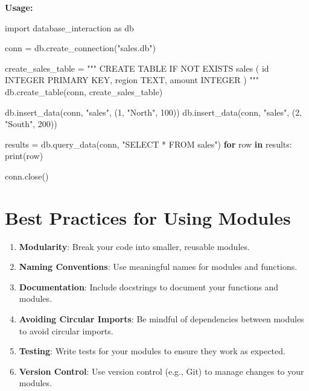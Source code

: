 \documentclass[
  letterpaper,
  DIV=11,
  numbers=noendperiod]{scrreprt}
\newenvironment{Shaded}{\begin{snugshade}}{\end{snugshade}}
\newcommand{\BuiltInTok}[1]{\textcolor[rgb]{0.00,0.23,0.31}{#1}}
\newcommand{\ControlFlowTok}[1]{\textcolor[rgb]{0.00,0.23,0.31}{\textbf{#1}}}
\newcommand{\DecValTok}[1]{\textcolor[rgb]{0.68,0.00,0.00}{#1}}
\newcommand{\ImportTok}[1]{\textcolor[rgb]{0.00,0.46,0.62}{#1}}
\newcommand{\KeywordTok}[1]{\textcolor[rgb]{0.00,0.23,0.31}{\textbf{#1}}}
\newcommand{\NormalTok}[1]{\textcolor[rgb]{0.00,0.23,0.31}{#1}}
\newcommand{\OperatorTok}[1]{\textcolor[rgb]{0.37,0.37,0.37}{#1}}
\newcommand{\StringTok}[1]{\textcolor[rgb]{0.13,0.47,0.30}{#1}}
\providecommand{\tightlist}{%
  \setlength{\itemsep}{0pt}\setlength{\parskip}{0pt}}\usepackage{longtable,booktabs,array}
\begin{document}
\textbf{Usage:}

\begin{Shaded}
\begin{Highlighting}[]
\ImportTok{import}\NormalTok{ database\_interaction }\ImportTok{as}\NormalTok{ db}

\NormalTok{conn }\OperatorTok{=}\NormalTok{ db.create\_connection(}\StringTok{"sales.db"}\NormalTok{)}

\NormalTok{create\_sales\_table }\OperatorTok{=} \StringTok{"""}
\StringTok{CREATE TABLE IF NOT EXISTS sales (}
\StringTok{    id INTEGER PRIMARY KEY,}
\StringTok{    region TEXT,}
\StringTok{    amount INTEGER}
\StringTok{)}
\StringTok{"""}
\NormalTok{db.create\_table(conn, create\_sales\_table)}

\NormalTok{db.insert\_data(conn, }\StringTok{"sales"}\NormalTok{, (}\DecValTok{1}\NormalTok{, }\StringTok{"North"}\NormalTok{, }\DecValTok{100}\NormalTok{))}
\NormalTok{db.insert\_data(conn, }\StringTok{"sales"}\NormalTok{, (}\DecValTok{2}\NormalTok{, }\StringTok{"South"}\NormalTok{, }\DecValTok{200}\NormalTok{))}

\NormalTok{results }\OperatorTok{=}\NormalTok{ db.query\_data(conn, }\StringTok{"SELECT * FROM sales"}\NormalTok{)}
\ControlFlowTok{for}\NormalTok{ row }\KeywordTok{in}\NormalTok{ results:}
    \BuiltInTok{print}\NormalTok{(row)}

\NormalTok{conn.close()}
\end{Highlighting}
\end{Shaded}

\section{Best Practices for Using
Modules}\label{best-practices-for-using-modules}

\begin{enumerate}
\def\labelenumi{\arabic{enumi}.}
\tightlist
\item
  \textbf{Modularity}: Break your code into smaller, reusable modules.
\item
  \textbf{Naming Conventions}: Use meaningful names for modules and
  functions.
\item
  \textbf{Documentation}: Include docstrings to document your functions
  and modules.
\item
  \textbf{Avoiding Circular Imports}: Be mindful of dependencies between
  modules to avoid circular imports.
\item
  \textbf{Testing}: Write tests for your modules to ensure they work as
  expected.
\item
  \textbf{Version Control}: Use version control (e.g., Git) to manage
  changes to your modules.
\end{enumerate}
\end{document}
